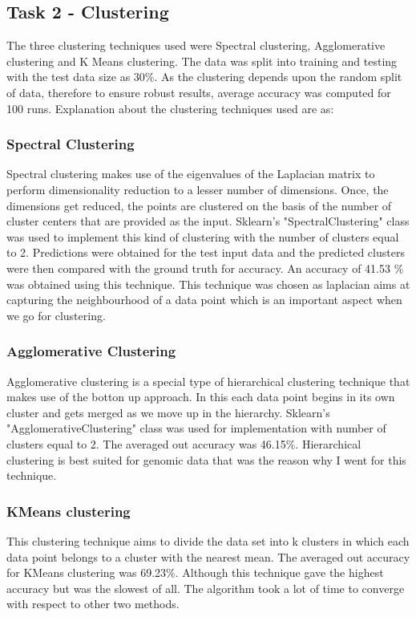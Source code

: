 \documentclass[11pt]{article}
\begin{document}
\subsection{Task 2 - Clustering}
The three clustering techniques used were Spectral clustering, Agglomerative clustering and K Means clustering. The data was split into training and testing with the test data size as 30\%. As the clustering depends upon the random split of data, therefore to ensure robust results, average accuracy was computed for 100 runs. Explanation about the clustering techniques used are as:

\subsubsection{Spectral Clustering}
Spectral clustering makes use of the eigenvalues of the Laplacian matrix to perform dimensionality reduction to a lesser number of dimensions. Once, the dimensions get reduced, the points are clustered on the basis of the number of cluster centers that are provided as the input. Sklearn's "SpectralClustering" class was used to implement this kind of clustering with the number of clusters equal to 2. Predictions were obtained for the test input data and the predicted clusters were then compared with the ground truth for accuracy. An accuracy of 41.53 \% was obtained using this technique. This technique was chosen as laplacian aims at capturing the neighbourhood of a data point which is an important aspect when we go for clustering.

\subsubsection{Agglomerative Clustering}
Agglomerative clustering is a special type of hierarchical clustering technique that makes use of the botton up approach. In this each data point begins in its own cluster and gets merged as we move up in the hierarchy. Sklearn's "AgglomerativeClustering" class was used for implementation with number of clusters equal to 2. The averaged out accuracy was 46.15\%. Hierarchical clustering is best suited for genomic data that was the reason why I went for this technique.

\subsubsection{KMeans clustering}
This clustering technique aims to divide the data set into k clusters in which each data point belongs to a cluster with the nearest mean. The averaged out accuracy for KMeans clustering was 69.23\%. Although this technique gave the highest accuracy but was the slowest of all. The algorithm took a lot of time to converge with respect to other two methods.
\end{document}
